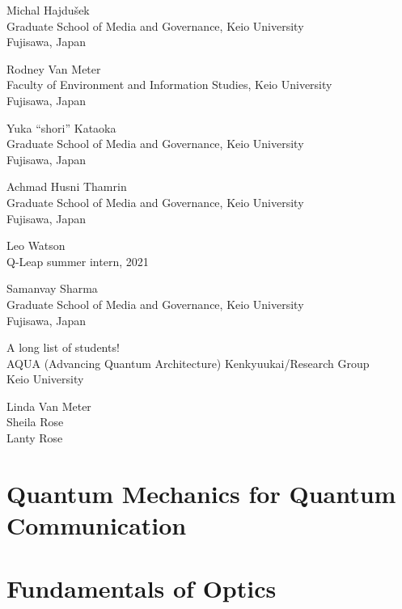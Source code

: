 \documentclass[6x9]{newmath}
\begin{document}
\begin{contributors}[twocolumn]

\contrib 
Michal Hajdu\v{s}ek\\
Graduate School of Media and Governance, Keio University\\
Fujisawa, Japan

\contrib 
Rodney Van Meter\\
Faculty of Environment and Information Studies, Keio University\\
Fujisawa, Japan

\contrib
Yuka ``shori'' Kataoka\\
Graduate School of Media and Governance, Keio University\\
Fujisawa, Japan

\contrib
Achmad Husni Thamrin\\
Graduate School of Media and Governance, Keio University\\
Fujisawa, Japan

\contrib
Leo Watson\\
Q-Leap summer intern, 2021

\contrib
Samanvay Sharma\\
Graduate School of Media and Governance, Keio University\\
Fujisawa, Japan

\contrib 
A long list of students!\\
AQUA (Advancing Quantum Architecture) Kenkyuukai/Research Group\\
Keio University

\contrib
Linda Van Meter\\

\contrib
Sheila Rose\\

\contrib
Lanty Rose\\

\end{contributors}




\part{Quantum Mechanics for Quantum Communication}






\part{Fundamentals of Optics}




\end{document}
